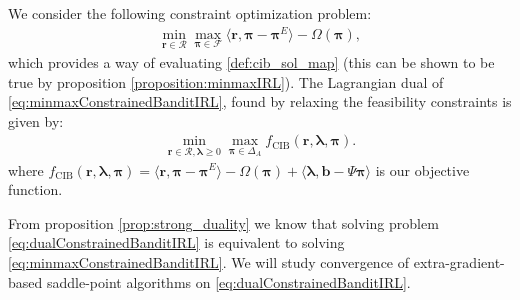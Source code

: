 We consider the following constraint optimization problem:
\begin{equation}
    \label{eq:minmaxConstrainedBanditIRL}
    \begin{aligned}
        \min_{\bm{r}\in\mathcal{R}}\max_{\bm{\pi}\in\mathcal{F}} \langle \bm{r}, \bm{\pi}-\bm{\pi}^E \rangle-\Omega(\bm{\pi}),
    \end{aligned}
\end{equation}
which provides a way of evaluating \ref{def:cib_sol_map} (this can be shown to be true by proposition \ref{proposition:minmaxIRL}). The Lagrangian dual of \ref{eq:minmaxConstrainedBanditIRL}, found by relaxing the feasibility constraints is given by:
\begin{equation}
    \label{eq:dualConstrainedBanditIRL}
    \begin{aligned}
        \min_{\bm{r}\in\mathcal{R},\bm{\lambda} \geq 0}\max_{\bm{\pi}\in\Delta_{A}} f_\text{CIB}(\bm{r},\bm{\lambda},\bm{\pi}).
    \end{aligned}
\end{equation}
where $f_\text{CIB}(\bm{r},\bm{\lambda},\bm{\pi}) = \langle \bm{r}, \bm{\pi}-\bm{\pi}^E \rangle -\Omega(\bm{\pi}) + \langle \bm{\lambda}, \bm{b}-\Psi \bm{\pi}\rangle$ is our objective function.

\noindent
From proposition \ref{prop:strong_duality} we know that solving problem \ref{eq:dualConstrainedBanditIRL} is equivalent to solving \ref{eq:minmaxConstrainedBanditIRL}. We will study convergence of extra-gradient-based saddle-point algorithms on \ref{eq:dualConstrainedBanditIRL}. \\%


